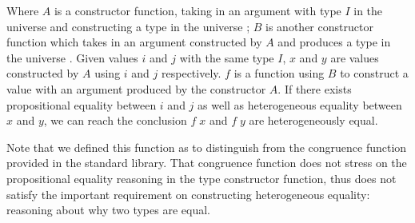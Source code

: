 \documentclass{l4proj}
\begin{document}
Where $A$ is a constructor function, taking in an argument with type $I$ in the universe \AgdaSpace{} and constructing a type in the universe \AgdaSpace{}; $B$ is another constructor function which takes in an argument constructed by $A$ and produces a type in the universe \AgdaSpace{}. Given values $i$ and $j$ with the same type $I$, $x$ and $y$ are values constructed by $A$ using $i$ and $j$ respectively. $f$ is a function using $B$ to construct a value with an argument produced by the constructor $A$. If there exists propositional equality between $i$ and $j$ as well as heterogeneous equality between $x$ and $y$, we can reach the conclusion $f\; x$ and $f\; y$ are heterogeneously equal.

Note that we defined this function as  to distinguish from the congruence function provided in the standard library. That congruence function does not stress on the propositional equality reasoning in the type constructor function, thus does not satisfy the important requirement on constructing heterogeneous equality: reasoning about why two types are equal.
\end{document}
